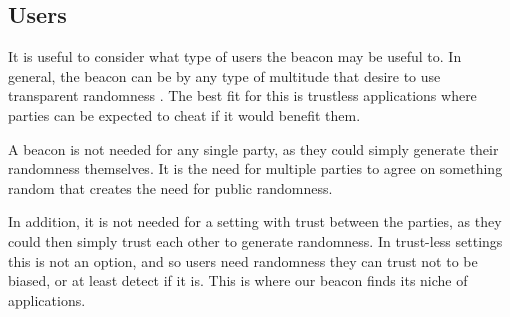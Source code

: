 \subsection{Users}
It is useful to consider what type of users the beacon may be useful to. In general, the beacon can be by any type of multitude that desire to use transparent randomness .
The best fit for this is trustless applications where parties can be expected to cheat if it would benefit them.

A beacon is not needed for any single party, as they could simply generate their randomness themselves.
It is the need for multiple parties to agree on something random that creates the need for public randomness.

In addition, it is not needed for a setting with trust between the parties, as they could then simply trust each other to generate randomness.
In trust-less settings this is not an option, and so users need randomness they can trust not to be biased, or at least detect if it is.
This is where our beacon finds its niche of applications.